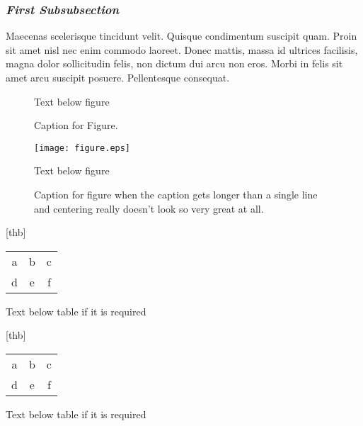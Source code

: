 \documentclass[dvips,11pt,twoside]{article}
\makeatletter
\renewenvironment{table}
               {\let\@makecaption\@maketablecaption%
               \let\@floatboxreset\@tableboxreset\@float{table}}
               {\end@float}
\def\@tableboxreset{%
        \reset@font%
        \centering\footnotesize%
        \def\arraystretch{1.0}
        \@setnobreak%
        \@setminipage%
}
\makeatother
\begin{document}
\subsubsection{\large\bf\it First Subsubsection}
Maecenas
scelerisque tincidunt velit.  Quisque condimentum suscipit quam.
Proin sit amet nisl nec enim commodo laoreet.  Donec mattis, massa id
ultrices facilisis, magna dolor sollicitudin felis, non dictum dui
arcu non eros.  Morbi in felis sit amet arcu suscipit posuere.
Pellentesque consequat.



\begin{figure}[thb]
\begin{center}
    
    {\small Text below figure}         
\end{center}
\caption{{\small Caption for Figure.}}
\end{figure}

\begin{figure}[thb]
\begin{center}
    \texttt{[image: figure.eps]}
    
    {\small Text below figure}         
\end{center}
\caption{{\small Caption for figure when the caption gets longer than a 
    single line 
    and centering really doesn't look so very great at all.}}
\end{figure}

\begin{table}[thb]
    \caption{{\small Caption for Table}}
\begin{center}
    \begin{tabular}{ccc}
	a&b&c\\
	d&e&f\\
	\end{tabular}
    
{\small Text below table  if it is required}         \end{center}

\end{table}

\begin{table}[thb]
    \caption{{\small Caption for table when the caption gets longer than a 
    single line 
    and centering really doesn't look so very great at all}}
\begin{center}
    \begin{tabular}{ccc}
	a&b&c\\
	d&e&f\\
	\end{tabular}
    
{\small Text below table if it is required}         \end{center}

\end{table}
\end{document}
